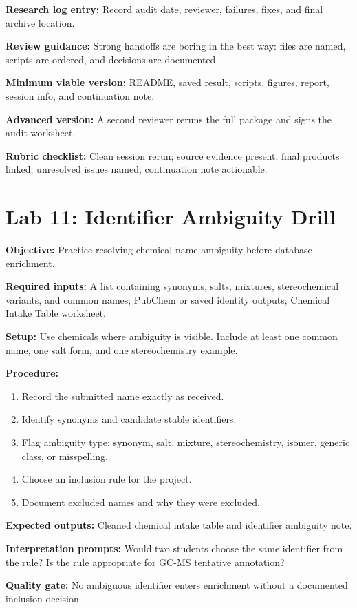 \textbf{Research log entry:} Record audit date, reviewer, failures, fixes, and final archive location.

\textbf{Review guidance:} Strong handoffs are boring in the best way: files are named, scripts are ordered, and decisions are documented.

\textbf{Minimum viable version:} README, saved result, scripts, figures, report, session info, and continuation note.

\textbf{Advanced version:} A second reviewer reruns the full package and signs the audit worksheet.

\textbf{Rubric checklist:} Clean session rerun; source evidence present; final products linked; unresolved issues named; continuation note actionable.

\section{Lab 11: Identifier Ambiguity Drill}
\textbf{Objective:} Practice resolving chemical-name ambiguity before database enrichment.

\textbf{Required inputs:} A list containing synonyms, salts, mixtures, stereochemical variants, and common names; PubChem or saved identity outputs; Chemical Intake Table worksheet.

\textbf{Setup:} Use chemicals where ambiguity is visible. Include at least one common name, one salt form, and one stereochemistry example.

\textbf{Procedure:}
\begin{enumerate}
  \item Record the submitted name exactly as received.
  \item Identify synonyms and candidate stable identifiers.
  \item Flag ambiguity type: synonym, salt, mixture, stereochemistry, isomer, generic class, or misspelling.
  \item Choose an inclusion rule for the project.
  \item Document excluded names and why they were excluded.
\end{enumerate}

\textbf{Expected outputs:} Cleaned chemical intake table and identifier ambiguity note.

\textbf{Interpretation prompts:} Would two students choose the same identifier from the rule? Is the rule appropriate for GC-MS tentative annotation?

\textbf{Quality gate:} No ambiguous identifier enters enrichment without a documented inclusion decision.

